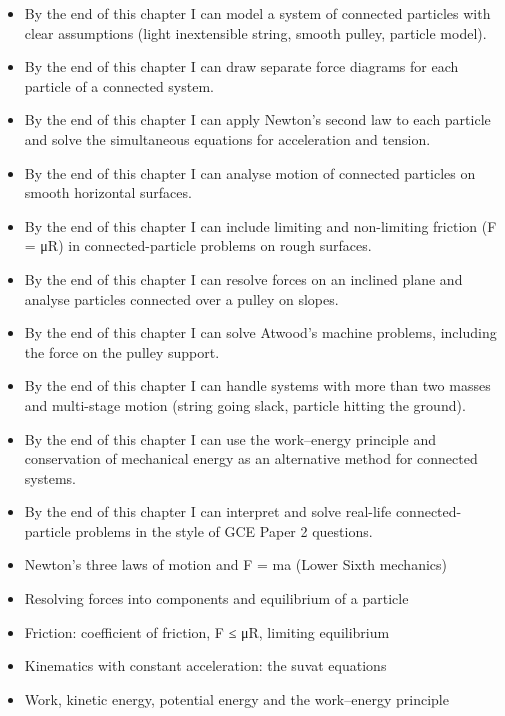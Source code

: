 \documentclass[11pt]{article}
\begin{document}
\begin{objectifs}
\begin{itemize}
\item By the end of this chapter I can model a system of connected particles with clear assumptions (light inextensible string, smooth pulley, particle model).
\item By the end of this chapter I can draw separate force diagrams for each particle of a connected system.
\item By the end of this chapter I can apply Newton's second law to each particle and solve the simultaneous equations for acceleration and tension.
\item By the end of this chapter I can analyse motion of connected particles on smooth horizontal surfaces.
\item By the end of this chapter I can include limiting and non-limiting friction (F = μR) in connected-particle problems on rough surfaces.
\item By the end of this chapter I can resolve forces on an inclined plane and analyse particles connected over a pulley on slopes.
\item By the end of this chapter I can solve Atwood's machine problems, including the force on the pulley support.
\item By the end of this chapter I can handle systems with more than two masses and multi-stage motion (string going slack, particle hitting the ground).
\item By the end of this chapter I can use the work–energy principle and conservation of mechanical energy as an alternative method for connected systems.
\item By the end of this chapter I can interpret and solve real-life connected-particle problems in the style of GCE Paper 2 questions.
\end{itemize}
\end{objectifs}

\begin{prerequis}
\begin{itemize}
\item Newton's three laws of motion and F = ma (Lower Sixth mechanics)
\item Resolving forces into components and equilibrium of a particle
\item Friction: coefficient of friction, F ≤ μR, limiting equilibrium
\item Kinematics with constant acceleration: the suvat equations
\item Work, kinetic energy, potential energy and the work–energy principle
\end{itemize}
\end{prerequis}
\end{document}
